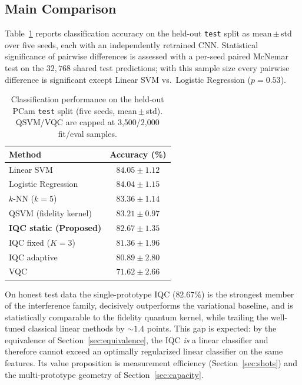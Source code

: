 \documentclass[conference]{IEEEtran}
\begin{document}
\subsection{Main Comparison}
\label{sec:main}
Table~\ref{tab:metrics} reports classification accuracy on the held-out \texttt{test} split as mean\,$\pm$\,std over five seeds, each with an independently retrained CNN. Statistical significance of pairwise differences is assessed with a per-seed paired McNemar test on the $32{,}768$ shared test predictions; with this sample size every pairwise difference is significant except Linear SVM vs.\ Logistic Regression ($p=0.53$).

\begin{table}[ht]
\centering
\caption{Classification performance on the held-out PCam \texttt{test} split (five seeds, mean\,$\pm$\,std). QSVM/VQC are capped at 3{,}500/2{,}000 fit/eval samples.}
\label{tab:metrics}
\begin{tabular}{l c}
\toprule
Method & Accuracy (\%) \\
\midrule
Linear SVM & $84.05 \pm 1.12$ \\
Logistic Regression & $84.04 \pm 1.15$ \\
$k$-NN ($k=5$) & $83.36 \pm 1.14$ \\
QSVM (fidelity kernel) & $83.21 \pm 0.97$ \\
\textbf{IQC static (Proposed)} & $\mathbf{82.67 \pm 1.35}$ \\
IQC fixed ($K{=}3$) & $81.36 \pm 1.96$ \\
IQC adaptive & $80.89 \pm 2.80$ \\
VQC & $71.62 \pm 2.66$ \\
\bottomrule
\end{tabular}
\end{table}

On honest test data the single-prototype IQC ($82.67\%$) is the strongest member of the interference family, decisively outperforms the variational baseline, and is statistically comparable to the fidelity quantum kernel, while trailing the well-tuned classical linear methods by $\sim\!1.4$ points. This gap is expected: by the equivalence of Section~\ref{sec:equivalence}, the IQC \emph{is} a linear classifier and therefore cannot exceed an optimally regularized linear classifier on the same features. Its value proposition is measurement efficiency (Section~\ref{sec:shots}) and the multi-prototype geometry of Section~\ref{sec:capacity}.
\end{document}
